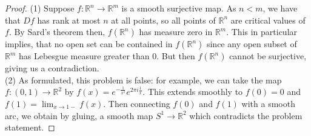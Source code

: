 \documentclass[reqno]{amsart}
\theoremstyle{definition}
\theoremstyle{remark}
\begin{document}
    \begin{proof}
        (1) Suppose $f \colon \mathbb{R}^{n} \to 
        \mathbb{R}^{m}$ is a smooth surjective map.
        As $n < m$, we have that
        $Df$ has rank at most $n$ at all points, so
        all points of  $\mathbb{R}^{n}$ are critical values
        of $f$. By Sard's theorem then,
        $f\left( \mathbb{R}^{n} \right) $ has
        measure zero in $\mathbb{R}^{m}$. This in particular implies,
        that no open set can be contained in
        $f\left( \mathbb{R}^{n} \right) $ since any
        open subset of $\mathbb{R}^{m}$ has Lebesgue measure
         greater than $0$. But then $f\left( \mathbb{R}^{n} \right) $ 
         cannot be surjective, giving us a contradiction.\\
         \linebreak
         (2) As formulated, this problem is false:
         for example, we can take the map
         $f \colon (0,1) \to \mathbb{R}^2$ by
         $f(x) = e^{-\frac{1}{x^2}} e^{2 \pi i \frac{1}{x}}$.
         This extends smoothly to
         $f(0) = 0$ and $f(1) = 
         \lim_{x \to 1-}f(x)$. Then connecting
         $f(0)$ and $f(1)$ with a smooth arc, we obtain
         by gluing, a smooth map
         $S^{1} \to \mathbb{R}^2$ which contradicts
         the problem statement.
     \end{proof}



\end{document}
